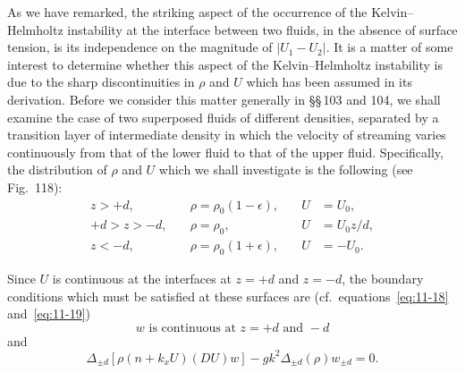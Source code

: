 As we have remarked, the striking aspect of the occurrence of the Kelvin--Helmholtz instability at the interface between two fluids, in the absence of surface tension, is its independence on the magnitude of $|U_1-U_2|$. It is a matter of some interest to determine whether this aspect of the Kelvin--Helmholtz instability is due to the sharp discontinuities in $\rho$ and $U$ which has been assumed in its derivation. Before we consider this matter generally in \S\S\,103 and 104, we shall examine the case of two superposed fluids of different densities, separated by a transition layer of intermediate density in which the velocity of streaming varies continuously from that of the lower fluid to that of the upper fluid. Specifically, the distribution of $\rho$ and $U$ which we shall investigate is the following (see Fig.\ 118):
\begin{equation}
\label{eq:11-43}
\begin{aligned}
z > +d, &\quad \rho = \rho_0(1-\epsilon), &\quad U &= U_0, \\
+d > z > -d, &\quad \rho = \rho_0, &\quad U &= U_0 z/d, \\
z < -d, &\quad \rho = \rho_0(1+\epsilon), &\quad U &= -U_0.
\end{aligned}
\end{equation}


Since $U$ is continuous at the interfaces at $z = +d$ and $z = -d$, the boundary conditions which must be satisfied at these surfaces are (cf.\ equations~\eqref{eq:11-18} and~\eqref{eq:11-19})
\begin{equation}
\label{eq:11-44}
w \text{ is continuous at } z = +d \text{ and } -d
\end{equation}
and
\begin{equation}
\label{eq:11-45}
\Delta_{\pm d}\!\left[\rho(n+k_x U)(DU)w\right] - gk^2\Delta_{\pm d}(\rho)w_{\pm d} = 0.
\end{equation}

